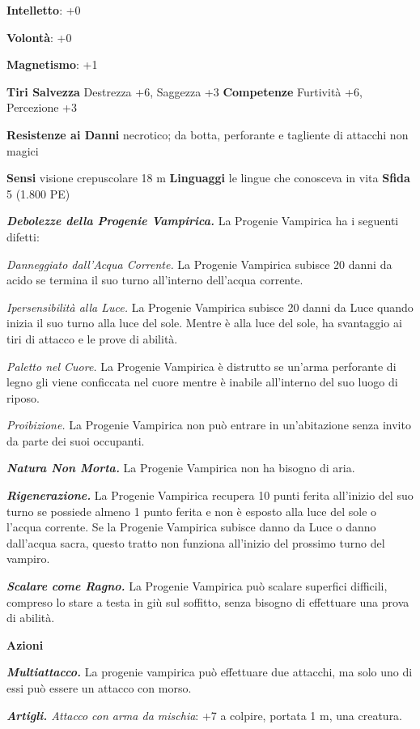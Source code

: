 \begin{multicols}{2}
\textbf{Intelletto}: +0

\textbf{Volontà}: +0

\textbf{Magnetismo}: +1

\textbf{Tiri Salvezza} Destrezza +6, Saggezza +3 \textbf{Competenze}
Furtività +6, Percezione +3

\textbf{Resistenze ai Danni} necrotico; da botta, perforante e
tagliente di attacchi non magici

\textbf{Sensi} visione crepuscolare 18 m
\textbf{Linguaggi} le lingue che conosceva in vita \textbf{Sfida} 5
(1.800 PE)\smallskip

\emph{\textbf{Debolezze della Progenie Vampirica.}} La Progenie
Vampirica ha i seguenti difetti:

\emph{Danneggiato dall'Acqua Corrente.} La Progenie Vampirica subisce 20
danni da acido se termina il suo turno all'interno dell'acqua corrente.

\emph{Ipersensibilità alla Luce.} La Progenie Vampirica subisce 20 danni da Luce quando inizia il suo turno alla luce del sole. Mentre è alla luce del sole, ha svantaggio ai tiri di attacco e le prove di abilità.

\emph{Paletto nel Cuore.} La Progenie Vampirica è distrutto se un'arma
perforante di legno gli viene conficcata nel cuore mentre è inabile
all'interno del suo luogo di riposo.

\emph{Proibizione.} La Progenie Vampirica non può entrare in
un'abitazione senza invito da parte dei suoi occupanti.

\emph{\textbf{Natura Non Morta.}} La Progenie Vampirica non ha bisogno
di aria.

\emph{\textbf{Rigenerazione.}} La Progenie Vampirica recupera 10 punti
ferita all'inizio del suo turno se possiede almeno 1 punto ferita e non
è esposto alla luce del sole o l'acqua corrente. Se la Progenie
Vampirica subisce danno da Luce o danno dall'acqua sacra, questo tratto
non funziona all'inizio del prossimo turno del vampiro.

\emph{\textbf{Scalare come Ragno.}} La Progenie Vampirica può scalare
superfici difficili, compreso lo stare a testa in giù sul soffitto,
senza bisogno di effettuare una prova di abilità.

\smallskip\textbf{Azioni}

\emph{\textbf{Multiattacco.}} La progenie vampirica può effettuare due
attacchi, ma solo uno di essi può essere un attacco con morso.

\emph{\textbf{Artigli.} Attacco con arma da mischia}: +7 a colpire,
portata 1 m, una creatura.


\end{multicols}

